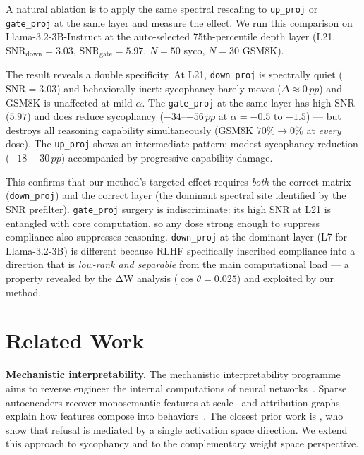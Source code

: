 \documentclass{article}
\newcommand{\snr}{\mathrm{SNR}}
\newcommand{\pp}{\,pp}
\begin{document}
A natural ablation is to apply the same spectral rescaling to \texttt{up\_proj} or \texttt{gate\_proj} at the same layer and measure the effect. We run this comparison on Llama-3.2-3B-Instruct at the auto-selected 75th-percentile depth layer (L21, $\snr_\mathrm{down}{=}3.03$, $\snr_\mathrm{gate}{=}5.97$, $N{=}50$ syco, $N{=}30$ GSM8K).

The result reveals a double specificity. At L21, \texttt{down\_proj} is spectrally quiet ($\snr{=}3.03$) and behaviorally inert: sycophancy barely moves ($\Delta{\approx}0\pp$) and GSM8K is unaffected at mild $\alpha$. The \texttt{gate\_proj} at the same layer has high SNR ($5.97$) and does reduce sycophancy (${-}34$--${-}56\pp$ at $\alpha{=}{-}0.5$ to $-1.5$) — but destroys all reasoning capability simultaneously (GSM8K $70\%{\to}0\%$ at \emph{every} dose). The \texttt{up\_proj} shows an intermediate pattern: modest sycophancy reduction (${-}18$--${-}30\pp$) accompanied by progressive capability damage.

This confirms that our method's targeted effect requires \emph{both} the correct matrix (\texttt{down\_proj}) and the correct layer (the dominant spectral site identified by the SNR prefilter). \texttt{gate\_proj} surgery is indiscriminate: its high SNR at L21 is entangled with core computation, so any dose strong enough to suppress compliance also suppresses reasoning. \texttt{down\_proj} at the dominant layer (L7 for Llama-3.2-3B) is different because RLHF specifically inscribed compliance into a direction that is \emph{low-rank and separable} from the main computational load — a property revealed by the ΔW analysis ($\cos\theta{=}0.025$) and exploited by our method.

\section{Related Work}
\label{sec:related}

\textbf{Mechanistic interpretability.}
The mechanistic interpretability programme aims to reverse engineer
the internal computations of neural
networks~\citep{elhageMathematicalFrameworkTransformer2021,
olahZoomIntroductionCircuits2020,sharkeyOpenProblemsMechInterp2025}.
Sparse autoencoders recover monosemantic features at
scale~\citep{brickenTowardsMonosemanticity2023,
templetonScalingMonosemanticity2024,gaoScalingSparseAutoencoders2024,
lieberumGemmaScope2024,marksSparseFeatureCircuits2024} and
attribution graphs explain how features compose into
behaviors~\citep{ameisenCircuitTracing2025,lindseyBiologyLLM2025}.
The closest prior work is
\citet{arditiRefusalLanguageModels2024}, who show that refusal is
mediated by a single activation space direction. We extend this
approach to sycophancy and to the complementary weight space
perspective.
\end{document}
